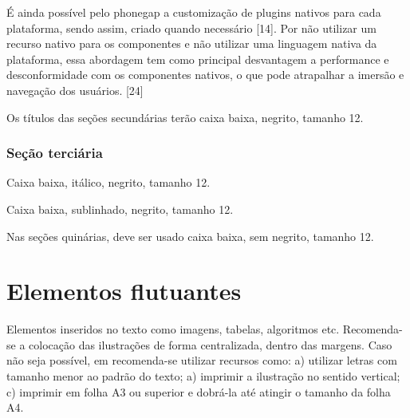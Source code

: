 É ainda possível pelo phonegap a customização de plugins nativos para cada plataforma, sendo assim, criado quando necessário [14]. Por não utilizar um recurso nativo para os componentes e não utilizar uma linguagem nativa da plataforma, essa abordagem tem como principal desvantagem a performance e desconformidade com os componentes nativos, o que pode atrapalhar a imersão e navegação dos usuários. [24]













































Os títulos das seções secundárias terão caixa baixa, negrito, tamanho 12.

\subsubsection{\esp Seção terciária}

Caixa baixa, itálico, negrito, tamanho 12.

 
 Caixa baixa, sublinhado, negrito, tamanho 12.
 
 
 Nas seções quinárias, deve ser usado caixa baixa, sem negrito, tamanho 12.

\section{\esp Elementos flutuantes}

Elementos inseridos no texto como imagens, tabelas, algoritmos etc.
Recomenda-se a colocação das ilustrações de forma centralizada, dentro das margens. 
Caso não seja possível, em  recomenda-se utilizar recursos como: 
 a) utilizar letras com tamanho menor ao padrão do texto; a) imprimir a ilustração no sentido vertical; 
 c) imprimir em folha A3 ou superior e dobrá-la até atingir o tamanho da folha A4. 

